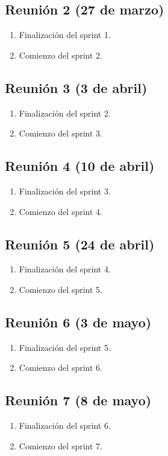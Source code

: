 \subsection{Reunión 2 (27 de marzo)}
\begin{enumerate}
	\item Finalización del sprint 1.
	\item Comienzo del sprint 2.
\end{enumerate}

\subsection{Reunión 3 (3 de abril)}
\begin{enumerate}
	\item Finalización del sprint 2.
	\item Comienzo del sprint 3.
\end{enumerate}

\subsection{Reunión 4 (10 de abril)}
\begin{enumerate}
	\item Finalización del sprint 3.
	\item Comienzo del sprint 4.
\end{enumerate}

\subsection{Reunión 5 (24 de abril)}
\begin{enumerate}
	\item Finalización del sprint 4.
	\item Comienzo del sprint 5.
\end{enumerate}

\subsection{Reunión 6 (3 de mayo)}
\begin{enumerate}
	\item Finalización del sprint 5.
	\item Comienzo del sprint 6.
\end{enumerate}

\subsection{Reunión 7 (8 de mayo)}
\begin{enumerate}
	\item Finalización del sprint 6.
	\item Comienzo del sprint 7.
\end{enumerate}

